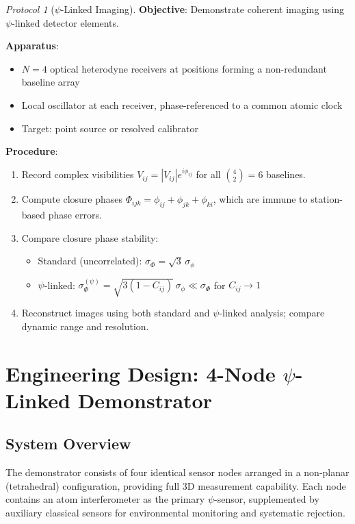 \documentclass[12pt,a4paper]{article}
\theoremstyle{remark}
\newtheorem{protocol}{Protocol}
\begin{document}
\begin{protocol}[$\psi$-Linked Imaging]\label{prot:imaging}
\textbf{Objective}: Demonstrate coherent imaging using $\psi$-linked
detector elements.

\textbf{Apparatus}:
\begin{itemize}
\item $N = 4$ optical heterodyne receivers at positions forming a
non-redundant baseline array
\item Local oscillator at each receiver, phase-referenced to a common
atomic clock
\item Target: point source or resolved calibrator
\end{itemize}

\textbf{Procedure}:
\begin{enumerate}
\item Record complex visibilities $V_{ij} = |V_{ij}|e^{i\phi_{ij}}$
for all $\binom{4}{2} = 6$ baselines.
\item Compute closure phases
$\Phi_{ijk} = \phi_{ij} + \phi_{jk} + \phi_{ki}$, which are immune to
station-based phase errors.
\item Compare closure phase stability:
\begin{itemize}
\item Standard (uncorrelated): $\sigma_{\Phi} = \sqrt{3}\,\sigma_\phi$
\item $\psi$-linked: $\sigma_{\Phi}^{(\psi)} = \sqrt{3(1-C_{ij})}\,\sigma_\phi
\ll \sigma_\Phi$ for $C_{ij} \to 1$
\end{itemize}
\item Reconstruct images using both standard and $\psi$-linked analysis;
compare dynamic range and resolution.
\end{enumerate}
\end{protocol}


\section{Engineering Design: 4-Node $\psi$-Linked Demonstrator}\label{sec:design}

\subsection{System Overview}

The demonstrator consists of four identical sensor nodes arranged in a
non-planar (tetrahedral) configuration, providing full 3D measurement
capability. Each node contains an atom interferometer as the primary
$\psi$-sensor, supplemented by auxiliary classical sensors for
environmental monitoring and systematic rejection.
\end{document}
